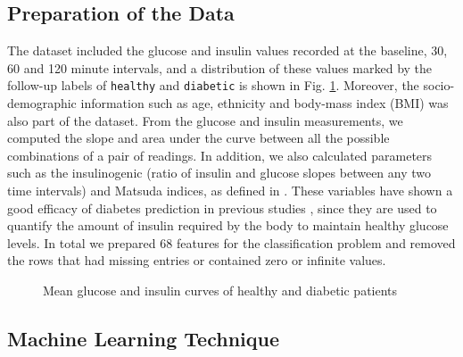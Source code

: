 \documentclass[journal,comsoc]{IEEEtran}
\begin{document}
\subsection{Preparation of the Data}
%
The dataset included the glucose and insulin values recorded at the baseline, \num{30}, \num{60} and \num{120} minute intervals, and a distribution of these values marked by the follow-up labels of \texttt{healthy} and \texttt{diabetic} is shown in Fig. \ref{fig:ogtt_mean}. Moreover, the socio-demographic information such as age, ethnicity and body-mass index (BMI) was also part of the dataset. From the glucose and insulin measurements, we computed the slope and area under the curve between all the possible combinations  of a pair of readings. In addition, we also calculated parameters such as the insulinogenic (ratio of insulin and glucose slopes between any two time intervals) and Matsuda indices, as defined in \cite{Matsuda1462,abdul-ghani_plasma_2009}. These variables have shown a good efficacy of diabetes prediction in previous studies \cite{abdul-ghani_what_2007,abdul-ghani_plasma_2009}, since they are used to quantify the amount of insulin required by the body to maintain healthy glucose levels. In total we prepared \num{68} features for the classification problem and removed the rows that had missing entries or contained zero or infinite values.
%
\begin{figure}[!h]
  \centering
  \hfil
      \caption{Mean glucose and insulin curves of healthy and diabetic patients}
    \label{fig:ogtt_mean}
\end{figure}

\subsection{Machine Learning Technique}
%
\end{document}

